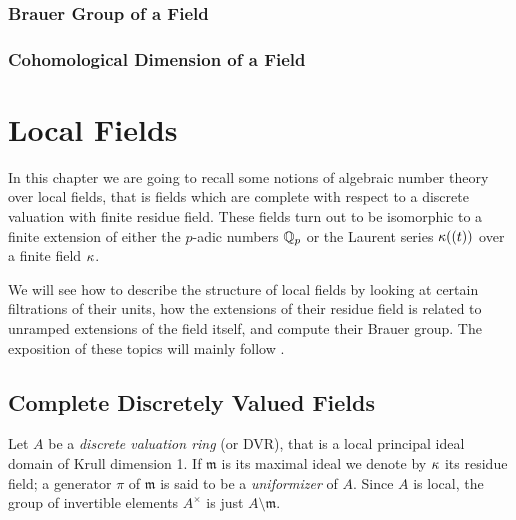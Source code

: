 \documentclass[a4paper, oneside]{memoir}
\begin{document}
\subsection{Brauer Group of a Field}
\begin{remark}\label{rm:CSA}

\end{remark}

\begin{proposition}\label{prop:BrMuN}

\end{proposition}

\subsection{Cohomological Dimension of a Field}
\begin{proposition}\label{prop:CdCharP}

\end{proposition}

\begin{proposition}\label{prop:prop:CdBr}

\end{proposition}


\chapter{Local Fields}
In this chapter we are going to recall some notions of algebraic number theory over local fields, that is fields which are complete with respect to a discrete valuation with finite
residue field. These fields turn out to be isomorphic to a finite extension of either the $p$-adic numbers $\mathbb{Q}_p$ or the Laurent series $\kappa((t))$ over a finite field $\kappa$.

We will see how to describe the structure of local fields by looking at certain filtrations of their units, how the extensions of their residue field is related to unramped
extensions of the field itself, and compute their Brauer group. The exposition of these topics will mainly follow \cite{SerreCL}.

\section{Complete Discretely Valued Fields}
Let $A$ be a \textit{discrete valuation ring} (or DVR), that is a local principal ideal domain of Krull dimension 1. If $\mathfrak{m}$ is its maximal ideal we denote by $\kappa$ its
residue field; a generator $\pi$ of $\mathfrak{m}$ is said to be a \textit{uniformizer} of $A$. Since $A$ is local, the group of invertible elements $A^\times$ is just
$A\setminus\mathfrak{m}$.
\end{document}
